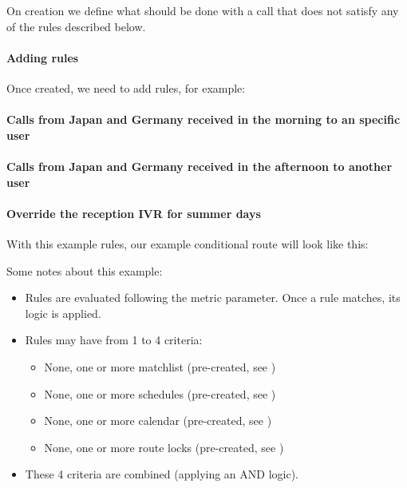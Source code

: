 \documentclass[letterpaper,10pt,english]{sphinxmanual}
\begin{document}
On creation we define what should be done with a call that does not satisfy any
of the rules described below.


\paragraph{Adding rules}
\label{administration_portal/client/vpbx/routing_endpoints/conditional_routes:adding-rules}
Once created, we need to add rules, for example:
\paragraph{Calls from Japan and Germany received in the morning to an specific user}
\paragraph{Calls from Japan and Germany received in the afternoon to another user}
\paragraph{Override the reception IVR for summer days}

With this example rules, our example conditional route will look like this:

Some notes about this example:
\begin{itemize}
\item {} 
Rules are evaluated following the metric parameter. Once a rule matches, its
logic is applied.

\item {} 
Rules may have from 1 to 4 criteria:
\begin{itemize}
\item {} 
None, one or more matchlist (pre-created, see {\hyperref[administration_portal/client/vpbx/routing_tools/match_lists:match\string-lists]{}})

\item {} 
None, one or more schedules (pre-created, see {\hyperref[administration_portal/client/vpbx/routing_tools/schedules:schedules]{}})

\item {} 
None, one or more calendar (pre-created, see {\hyperref[administration_portal/client/vpbx/routing_tools/calendars:calendars]{}})

\item {} 
None, one or more route locks (pre-created, see {\hyperref[administration_portal/client/vpbx/routing_tools/route_locks:route\string-locks]{}})

\end{itemize}

\item {} 
These 4 criteria are combined (applying an AND logic).

\end{itemize}
\end{document}
